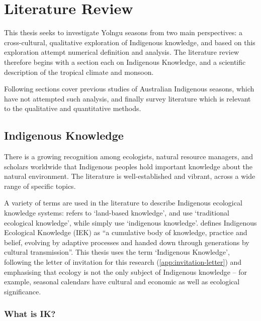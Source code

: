 \chapter{Literature Review}
\label{ch:lit-review}


This thesis seeks to investigate Yolngu seasons from two main perspectives:
a cross-cultural, qualitative exploration of Indigenous knowledge, and
based on this exploration attempt numerical definition and analysis.
The literature review therefore begins with a section each on Indigenous
Knowledge, and a scientific description of the tropical climate and monsoon.

Following sections cover previous studies of Australian Indigenous seasons,
which have not attempted such analysis, and finally survey literature which is
relevant to the qualitative and quantitative methods.



\section{Indigenous Knowledge}
\label{sec:lit-iek}



There is a growing recognition among ecologists, natural resource managers, and
scholars worldwide that Indigenous peoples hold important knowledge about the
natural environment.  The literature is well-established and vibrant, across a
wide range of specific topics.

A variety of terms are used in the literature to describe Indigenous
ecological knowledge systems:  \citet{clarke2009} refers to `land-based knowledge',
\citet{petheram2010} and \citet{turner2009} use `traditional ecological
knowledge', while \citet{cochran2015} simply use `indigenous knowledge'.
\citet{berkes2012} defines Indigenous Ecological Knowledge (IEK) as ``a cumulative
body of knowledge, practice and belief, evolving by adaptive processes and
handed down through generations by cultural transmission''.  This thesis uses
the term `Indigenous Knowledge', following the letter of invitation for this
research (\cref{app:invitation-letter}) and emphasising that ecology is not the
only subject of Indigenous knowledge -- for example, seasonal calendars have
cultural and economic as well as ecological significance.



\subsection{What is IK?}

